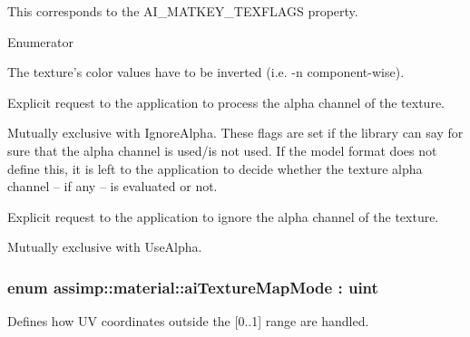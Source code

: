 This corresponds to the {\ttfamily A\+I\+\_\+\+M\+A\+T\+K\+E\+Y\+\_\+\+T\+E\+X\+F\+L\+A\+G\+S} property. \begin{Desc}
\item[Enumerator]\par
\begin{description}
\item[{\em 
\hypertarget{namespaceassimp_1_1material_a6e22b08c06f24f15471e5c167a3d6c8da9659ad9ec6bbe7a8836a250bce874008}{Invert}\label{namespaceassimp_1_1material_a6e22b08c06f24f15471e5c167a3d6c8da9659ad9ec6bbe7a8836a250bce874008}
}]The texture's color values have to be inverted (i.\+e. {-\/n} component-\/wise). \item[{\em 
\hypertarget{namespaceassimp_1_1material_a6e22b08c06f24f15471e5c167a3d6c8daae9e40e6ecc702196aa5bee102f6d23f}{Use\+Alpha}\label{namespaceassimp_1_1material_a6e22b08c06f24f15471e5c167a3d6c8daae9e40e6ecc702196aa5bee102f6d23f}
}]Explicit request to the application to process the alpha channel of the texture.

Mutually exclusive with {\ttfamily Ignore\+Alpha}. These flags are set if the library can say for sure that the alpha channel is used/is not used. If the model format does not define this, it is left to the application to decide whether the texture alpha channel – if any – is evaluated or not. \item[{\em 
\hypertarget{namespaceassimp_1_1material_a6e22b08c06f24f15471e5c167a3d6c8da584fb90d91bf15981bf0543d97598def}{Ignore\+Alpha}\label{namespaceassimp_1_1material_a6e22b08c06f24f15471e5c167a3d6c8da584fb90d91bf15981bf0543d97598def}
}]Explicit request to the application to ignore the alpha channel of the texture.

Mutually exclusive with {\ttfamily Use\+Alpha}. \end{description}
\end{Desc}
\hypertarget{namespaceassimp_1_1material_a0d8dbb0d9e989bf10557feef7350c42b}{
\subsubsection[{ai\+Texture\+Map\+Mode}]{\setlength{\rightskip}{0pt plus 5cm}enum {\bf assimp\+::material\+::ai\+Texture\+Map\+Mode} \+: uint}}\label{namespaceassimp_1_1material_a0d8dbb0d9e989bf10557feef7350c42b}
Defines how U\+V coordinates outside the {\ttfamily \mbox{[}0..1\mbox{]}} range are handled.

